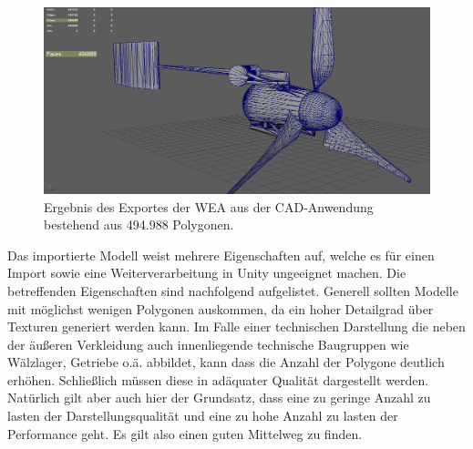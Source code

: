 \begin{figure}[H]
	\centering
	\captionsetup{width=1\textwidth}
	\includegraphics[keepaspectratio, width=1\textwidth]{bildquellen/WEA-Vergleich1}
	\caption{Ergebnis des Exportes der WEA aus der CAD-Anwendung bestehend aus 494.988 Polygonen.}
	\label{fig:2.2}
\end{figure}

Das importierte Modell  weist mehrere Eigenschaften auf, welche es für einen Import sowie eine Weiterverarbeitung in Unity ungeeignet machen. Die betreffenden Eigenschaften sind nachfolgend aufgelistet. 
Generell sollten Modelle mit möglichst wenigen Polygonen auskommen, da ein hoher Detailgrad über Texturen generiert werden kann. Im Falle einer technischen Darstellung die neben der äußeren Verkleidung auch innenliegende technische Baugruppen wie Wälzlager, Getriebe o.ä. abbildet, kann dass die Anzahl der Polygone deutlich erhöhen. Schließlich müssen diese in adäquater Qualität dargestellt werden. Natürlich gilt aber auch hier der Grundsatz, dass eine zu geringe Anzahl zu lasten der Darstellungsqualität und eine zu hohe Anzahl zu lasten der Performance geht. Es gilt also einen guten Mittelweg zu finden. 


